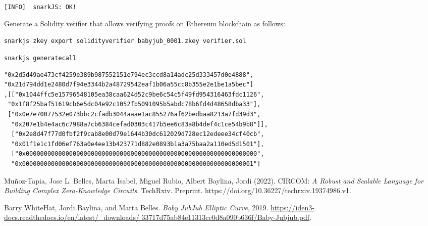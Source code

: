 \documentclass[a4paper,oneside,12pt]{book}
\begin{document}
\verb|[INFO]  snarkJS: OK!|

\noindent Generate a Solidity verifier that allows verifying proofs on Ethereum blockchain as follows:

\verb|snarkjs zkey export solidityverifier babyjub_0001.zkey verifier.sol|

\verb|snarkjs generatecall|

\begin{verbatim}
"0x2d5d49ae473cf4259e389b987552151e794ec3ccd8a14adc25d333457d0e4888",
"0x21d794dd1e2480d7f94e3344b2a48729542eaf1b06a55cc8b355e2e1be1a5bec"]
,[["0x1044ffc5e15796548105ea38caa624d52c9be6c54c5f49fd954316463fdc1126",
 "0x1f8f25baf51619cb6e5dc04e92c1052fb5091095b5abdc78b6fd4d48658dba33"],
 ["0x0e7e70077532e073bbc2cfadb3044aaae1ac855276af62bedbaa8213a7fd39d3",
  "0x207e1b4e4ac6c7988a7cb6384cefad0303c417b5ee6c83a8b4def4c1ce54b9b8"]],
  ["0x2e8d47f77d0fbf2f9cab8e00d79e1644b30dc612029d728ec12edeee34cf40cb",
  "0x01f1e1c1fd06ef763a0e4ee13b423771d882e0893b1a3a75baa2a110ed5d1501"],
  ["0x0000000000000000000000000000000000000000000000000000000000000000",
  "0x0000000000000000000000000000000000000000000000000000000000000001"]
\end{verbatim}



\begin{thebibliography}{99}
 Muñoz-Tapia, Jose L. Belles, Marta Isabel, Miguel Rubio, Albert Baylina, Jordi (2022). CIRCOM: \textit{A Robust and Scalable Language for Building Complex Zero-Knowledge Circuits}. TechRxiv. Preprint. https://doi.org/10.36227/techrxiv.19374986.v1. 	

 Barry WhiteHat, Jordi Baylina, and Marta Belles. \textit{Baby JubJub Elliptic Curve}, 2019. \url{https://iden3-docs.readthedocs.io/en/latest/_downloads/
33717d75ab84e11313cc0d8a090b636f/Baby-Jubjub.pdf}.
\end{thebibliography}

\end{document}
